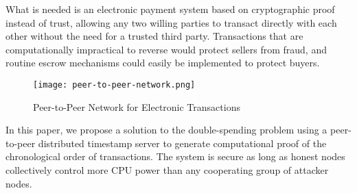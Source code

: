 \documentclass{article}
\begin{document}
What is needed is an electronic payment system based on cryptographic proof instead of trust, allowing any two willing parties to transact directly with each other without the need for a trusted third party. Transactions that are computationally impractical to reverse would protect sellers from fraud, and routine escrow mechanisms could easily be implemented to protect buyers.

\begin{figure}[h]
\centering
\texttt{[image: peer-to-peer-network.png]}
\caption{Peer-to-Peer Network for Electronic Transactions}
\end{figure}

In this paper, we propose a solution to the double-spending problem using a peer-to-peer distributed timestamp server to generate computational proof of the chronological order of transactions. The system is secure as long as honest nodes collectively control more CPU power than any cooperating group of attacker nodes.
\end{document}
